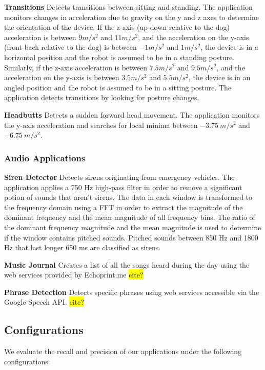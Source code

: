 {\bf Transitions} Detects transitions between sitting and
  standing.  The application monitors changes in acceleration due to
  gravity on the y and z axes to determine the orientation of the
  device. If the z-axis (up-down relative to the dog) acceleration is
  between $9 m/s^2$ and $11 m/s^2$, and the acceleration on the y-axis
  (front-back relative to the dog) is between $-1 m/s^2$ and $1
  m/s^2$, the device is in a horizontal position and the robot is
  assumed to be in a standing posture. Similarly, if the z-axis
  acceleration is between $7.5 m/s^2$ and $9.5 m/s^2$, and the
  acceleration on the y-axis is between $3.5 m/s^2$ and $5.5 m/s^2$,
  the device is in an angled position and the robot is assumed to be
  in a sitting posture. The application detects transitions by looking
  for posture changes.

{\bf Headbutts} Detects a sudden forward head movement.  The
  application monitors the y-axis acceleration and searches for local
  minima between $-3.75\:m/s^2$ and $-6.75\:m/s^2$.

\subsubsection{Audio Applications}

{\bf Siren Detector} Detects sirens originating from
emergency vehicles.  The application applies a 750 Hz high-pass filter 
in order to remove a significant
potion of sounds that aren't sirens.  The data in each window is transformed 
to the frequency domain using a FFT in order to extract the magnitude of the 
dominant frequency and the mean magnitude of all frequency bins.  The ratio
of the dominant frequency magnitude and the mean magnitude is used to determine
if the window contains pitched sounds.  Pitched sounds between 850 Hz and 1800 Hz
that last longer 650 ms are classified as sirens. 

{\bf Music Journal} Creates a list of all the songs heard during the
day using the web services provided by Echoprint.me \hl{cite?}

{\bf Phrase Detection} Detects specific phrases using web services
accessible via the Google Speech API. \hl{cite?}


\subsection{Configurations}

We evaluate the recall and precision of our applications under the following configurations:

